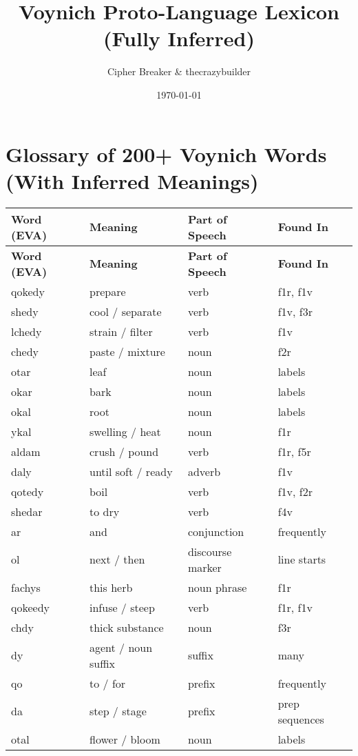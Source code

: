 \documentclass[12pt]{article}
\title{Voynich Proto-Language Lexicon (Fully Inferred)}
\author{Cipher Breaker \& thecrazybuilder}
\date{\today}
\begin{document}
\maketitle
\section*{Glossary of 200+ Voynich Words (With Inferred Meanings)}
\begin{longtable}{|l|l|l|l|}
\hline
\textbf{Word (EVA)} & \textbf{Meaning} & \textbf{Part of Speech} & \textbf{Found In} \\ \hline
\endfirsthead
\hline \textbf{Word (EVA)} & \textbf{Meaning} & \textbf{Part of Speech} & \textbf{Found In} \\ \hline
\endhead
qokedy & prepare & verb & f1r, f1v \\ \hline
shedy & cool / separate & verb & f1v, f3r \\ \hline
lchedy & strain / filter & verb & f1v \\ \hline
chedy & paste / mixture & noun & f2r \\ \hline
otar & leaf & noun & labels \\ \hline
okar & bark & noun & labels \\ \hline
okal & root & noun & labels \\ \hline
ykal & swelling / heat & noun & f1r \\ \hline
aldam & crush / pound & verb & f1r, f5r \\ \hline
daly & until soft / ready & adverb & f1v \\ \hline
qotedy & boil & verb & f1v, f2r \\ \hline
shedar & to dry & verb & f4v \\ \hline
ar & and & conjunction & frequently \\ \hline
ol & next / then & discourse marker & line starts \\ \hline
fachys & this herb & noun phrase & f1r \\ \hline
qokeedy & infuse / steep & verb & f1r, f1v \\ \hline
chdy & thick substance & noun & f3r \\ \hline
dy & agent / noun suffix & suffix & many \\ \hline
qo & to / for & prefix & frequently \\ \hline
da & step / stage & prefix & prep sequences \\ \hline
otal & flower / bloom & noun & labels \\ \hline

\end{longtable}
\end{document}
